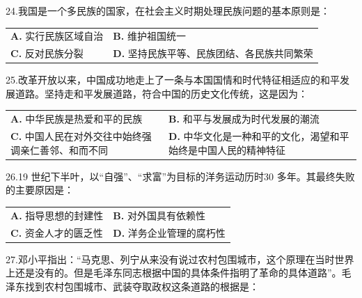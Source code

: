 \documentclass[UTF8,11pt]{ctexart}
\begin{document}
24.我国是一个多民族的国家，在社会主义时期处理民族问题的基本原则是：


\begin{center}\begin{tabular}{>{\raggedright\arraybackslash}p{\dimexpr(\linewidth-4\tabcolsep)/2\relax}>{\raggedright\arraybackslash}p{\dimexpr(\linewidth-4\tabcolsep)/2\relax}}
\textbf{A.} 实行民族区域自治 & \textbf{B.} 维护祖国统一\\[.35em]
\textbf{C.} 反对民族分裂 & \textbf{D.} 坚持民族平等、民族团结、各民族共同繁荣\\[.35em]\end{tabular}\end{center}

25.改革开放以来，中国成功地走上了一条与本国国情和时代特征相适应的和平发展道路。坚持走和平发展道路，符合中国的历史文化传统，这是因为：


\begin{center}\begin{tabular}{>{\raggedright\arraybackslash}p{\dimexpr(\linewidth-4\tabcolsep)/2\relax}>{\raggedright\arraybackslash}p{\dimexpr(\linewidth-4\tabcolsep)/2\relax}}
\textbf{A.} 中华民族是热爱和平的民族 & \textbf{B.} 和平与发展成为时代发展的潮流\\[.35em]
\textbf{C.} 中国人民在对外交往中始终强调亲仁善邻、和而不同 & \textbf{D.} 中华文化是一种和平的文化，渴望和平始终是中国人民的精神特征\\[.35em]\end{tabular}\end{center}

26.19 世纪下半叶，以“自强”、“求富”为目标的洋务运动历时30 多年。其最终失败的主要原因是：


\begin{center}\begin{tabular}{>{\raggedright\arraybackslash}p{\dimexpr(\linewidth-4\tabcolsep)/2\relax}>{\raggedright\arraybackslash}p{\dimexpr(\linewidth-4\tabcolsep)/2\relax}}
\textbf{A.} 指导思想的封建性 & \textbf{B.} 对外国具有依赖性\\[.35em]
\textbf{C.} 资金人才的匮乏性 & \textbf{D.} 洋务企业管理的腐朽性\\[.35em]\end{tabular}\end{center}

27.邓小平指出：“马克思、列宁从来没有说过农村包围城市，这个原理在当时世界上还是没有的。但是毛泽东同志根据中国的具体条件指明了革命的具体道路”。毛泽东找到农村包围城市、武装夺取政权这条道路的根据是：
\end{document}
